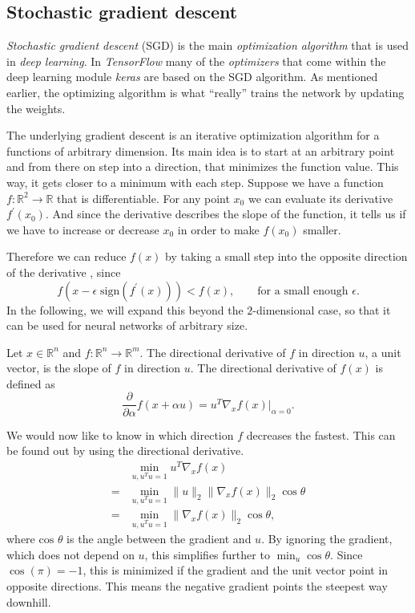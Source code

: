 \subsection{Stochastic gradient descent}
\label{sec:stochastic-gradient-descent}
\emph{Stochastic gradient descent} (SGD) is the main \emph{optimization algorithm} that is used in \emph{deep learning}.
In \emph{TensorFlow} \cite{tensorflow2015-whitepaper} many of the \emph{optimizers} that come within the deep learning module \emph{keras} are based on the SGD algorithm.
As mentioned earlier, the optimizing algorithm is what \enquote{really} trains the network by updating the weights.

The underlying gradient descent is an iterative optimization algorithm for a functions of arbitrary dimension.
Its main idea is to start at an arbitrary point and from there on step into a direction, that minimizes the function value.
This way, it gets closer to a minimum with each step.
Suppose we have a function \(f : \mathbb{R}^2 \rightarrow \mathbb{R}\) that is differentiable.
For any point \(x_0\) we can evaluate its derivative \(f^{\prime}(x_0)\).
And since the derivative describes the slope of the function, it tells us if we have to increase or decrease \(x_0\) in order to make \(f(x_0)\) smaller.

Therefore we can reduce \(f(x)\) by taking a small step into the opposite direction of the derivative \cite{cauchy}, since
\begin{equation}
    \label{eq:cauchy}
    f(x - \epsilon \; \text{sign}(f^{\prime}(x))) < f(x), \qquad \text{for a small enough } \epsilon.
\end{equation}
In the following, we will expand this beyond the \(2\)-dimensional case, so that it can be used for neural networks of arbitrary size.

Let \(x \in \mathbb{R}^n\) and \(f : \mathbb{R}^n \rightarrow \mathbb{R}^m\).
The directional derivative of \(f\) in direction \(u\), a unit vector, is the slope of \(f\) in direction \(u\).
The directional derivative of \(f(x)\) is defined as 
\begin{equation}
    \frac{\partial}{\partial \alpha} f(x + \alpha u) = u^{T} \nabla_x f(x) \big\vert_{\alpha = 0}.
\end{equation}

We would now like to know in which direction \(f\) decreases the fastest.
This can be found out by using the directional derivative.
\begin{align}
      &\min_{u, u^{T}u = 1} u^{T} \nabla_x f(x) \\
    = &\min_{u, u^{T}u = 1} \lVert u \rVert_2 \lVert \nabla_x f(x) \rVert_2 \cos \theta \\
    = &\min_{u, u^{T}u = 1} \lVert \nabla_x f(x) \rVert_2 \cos \theta,
\end{align}
where \(\text{cos } \theta\) is the angle between the gradient and \(u\).
By ignoring the gradient, which does not depend on \(u\), this simplifies further to \(\min_{u} \cos \theta\).
Since \(\cos(\pi) = -1\), this is minimized if the gradient and the unit vector point in opposite directions.
This means the negative gradient points the steepest way downhill.

